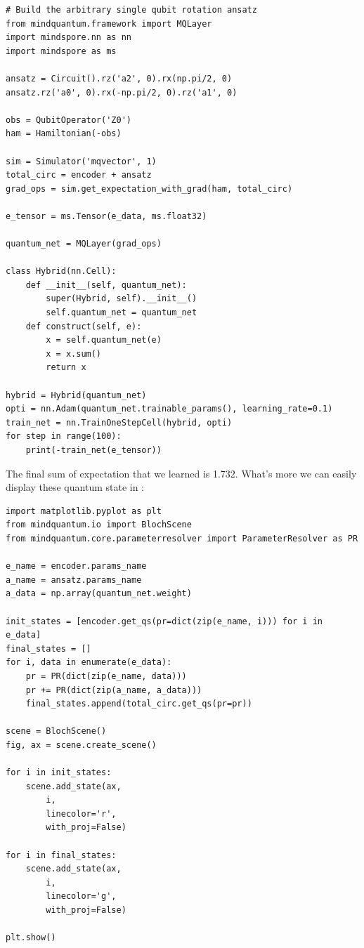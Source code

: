 \begin{lstlisting}
# Build the arbitrary single qubit rotation ansatz
from mindquantum.framework import MQLayer
import mindspore.nn as nn
import mindspore as ms

ansatz = Circuit().rz('a2', 0).rx(np.pi/2, 0)
ansatz.rz('a0', 0).rx(-np.pi/2, 0).rz('a1', 0)

obs = QubitOperator('Z0')
ham = Hamiltonian(-obs)

sim = Simulator('mqvector', 1)
total_circ = encoder + ansatz
grad_ops = sim.get_expectation_with_grad(ham, total_circ)

e_tensor = ms.Tensor(e_data, ms.float32)

quantum_net = MQLayer(grad_ops)

class Hybrid(nn.Cell):
    def __init__(self, quantum_net):
        super(Hybrid, self).__init__()
        self.quantum_net = quantum_net
    def construct(self, e):
        x = self.quantum_net(e)
        x = x.sum()
        return x

hybrid = Hybrid(quantum_net)
opti = nn.Adam(quantum_net.trainable_params(), learning_rate=0.1)
train_net = nn.TrainOneStepCell(hybrid, opti)
for step in range(100):
    print(-train_net(e_tensor))
\end{lstlisting}
The final sum of expectation that we learned is 1.732. What's more we can easily display these quantum state in \MindQuantum:

\begin{lstlisting}
import matplotlib.pyplot as plt
from mindquantum.io import BlochScene
from mindquantum.core.parameterresolver import ParameterResolver as PR

e_name = encoder.params_name
a_name = ansatz.params_name
a_data = np.array(quantum_net.weight)

init_states = [encoder.get_qs(pr=dict(zip(e_name, i))) for i in e_data]
final_states = []
for i, data in enumerate(e_data):
    pr = PR(dict(zip(e_name, data)))
    pr += PR(dict(zip(a_name, a_data)))
    final_states.append(total_circ.get_qs(pr=pr))

scene = BlochScene()
fig, ax = scene.create_scene()

for i in init_states:
    scene.add_state(ax,
        i,
        linecolor='r',
        with_proj=False)

for i in final_states:
    scene.add_state(ax,
        i,
        linecolor='g',
        with_proj=False)

plt.show()
\end{lstlisting}

